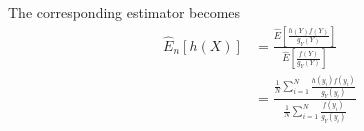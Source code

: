 The corresponding estimator becomes
\begin{equation*}
\begin{split}
\widehat{E}_n[h(X)] & = \frac{\widehat{E}\left [ \frac{h(Y)f(Y)}{g_Y(Y)}\right ]}{\widehat{E}\left [ \frac{f(Y)}{g_Y(Y)}\right ]} \\
& = \frac{\frac{1}{N}\sum_{i = 1}^{N}\frac{h(y_i)f(y_i)}{g_Y(y_i)}}{\frac{1}{N}\sum_{i = 1}^{N}\frac{f(y_i)}{g_Y(y_i)}} \\
\end{split}
\end{equation*}
